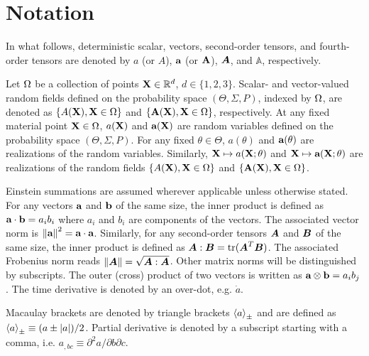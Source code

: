 \section{Notation}

In what follows, deterministic scalar, vectors, second-order tensors, and fourth-order tensors are denoted by $a$ (or $A$), $\textbf{a}$ (or $\textbf{A}$), $\boldsymbol{A}$, and $\mathbb{A}$, respectively.

Let $\Omega$ be a collection of points $\textbf{X} \in \mathbb{R}^d$, $d \in \{1, 2, 3\}$. Scalar- and vector-valued random fields defined on the probability space $(\Theta, \Sigma, P)$, indexed by $\Omega$, are denoted as $\{ A(\textbf{X}), \textbf{X} \in \Omega \}$ and $\{ \textbf{A}(\textbf{X}), \textbf{X} \in \Omega \}$, respectively.
At any fixed material point $\textbf{X} \in \Omega$, $a(\textbf{X})$ and $\textbf{a}(\textbf{X})$ are random variables defined on the probability space $(\Theta, \Sigma, P)$. For any fixed $\theta \in \Theta$, $a(\theta)$ and $\textbf{a}(\theta)$ are realizations of the random variables.
Similarly, $\textbf{X} \mapsto a(\textbf{X};\theta)$ and $\textbf{X} \mapsto \textbf{a}(\textbf{X};\theta)$ are realizations of the random fields $\{ A(\textbf{X}), \textbf{X} \in \Omega \}$ and $\{ \textbf{A}(\textbf{X}), \textbf{X} \in \Omega \}$.

Einstein summations are assumed wherever applicable unless otherwise stated. For any vectors $\textbf{a}$ and $\textbf{b}$ of the same size, the inner product is defined as $\textbf{a} \cdot \textbf{b} = a_ib_i$ where $a_i$ and $b_i$ are components of the vectors. The associated vector norm is $\left\lVert\textbf{a}\right\rVert^2 = \textbf{a} \cdot \textbf{a}$. Similarly, for any second-order tensors $\boldsymbol{A}$ and $\boldsymbol{B}$ of the same size, the inner product is defined as $\boldsymbol{A} : \boldsymbol{B} = \operatorname{tr}(\boldsymbol{A}^T \boldsymbol{B})$. The associated Frobenius norm reads $\left\lVert\boldsymbol{A}\right\rVert = \sqrt{\boldsymbol{A} : \boldsymbol{A}}$. Other matrix norms will be distinguished by subscripts.
The outer (cross) product of two vectors is written as $\textbf{a} \otimes \textbf{b} = a_ib_j$. The time derivative is denoted by an over-dot, e.g. $\dot{a}$.

Macaulay brackets are denoted by triangle brackets $\left<a\right>_\pm$ and are defined as $\left<a\right>_\pm \equiv (a\pm\left\vert{a}\right\vert)/2$. Partial derivative is denoted by a subscript starting with a comma, i.e. $ a_{,bc} \equiv \partial^2 a / \partial b \partial c $.
